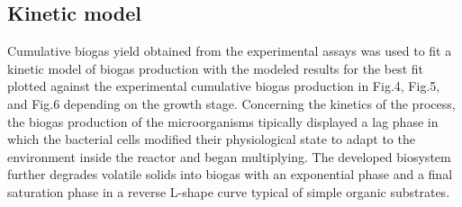 \subsection{Kinetic model}
Cumulative biogas yield obtained from the experimental assays was used to fit a kinetic model of biogas production with the modeled results for the best fit plotted against the experimental cumulative biogas production in Fig.4, Fig.5, and Fig.6 depending on the growth stage. 
Concerning the kinetics of the process, the biogas production of the microorganisms tipically displayed a lag phase in which the bacterial cells modified their physiological state to adapt to the environment inside the reactor and began multiplying. The developed biosystem further degrades volatile solids into biogas with an exponential phase and a final saturation phase in a reverse L-shape curve typical of simple organic substrates.  